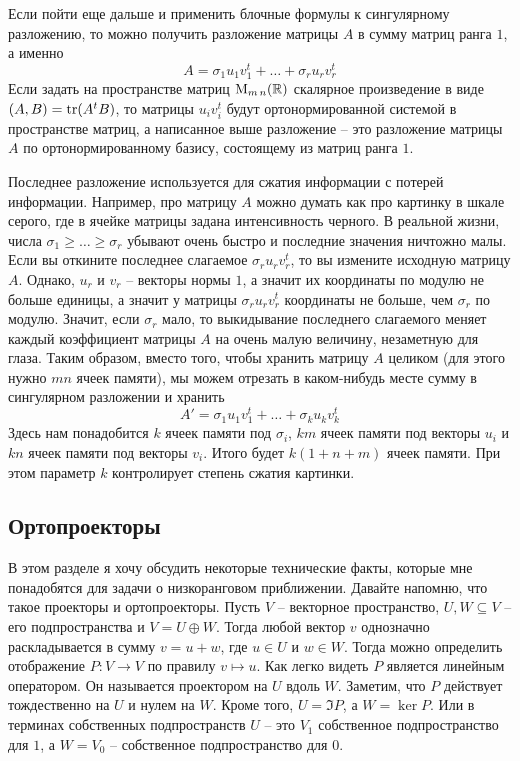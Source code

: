Если пойти еще дальше и применить блочные формулы к сингулярному разложению, то можно получить разложение матрицы $A$ в сумму матриц ранга $1$, а именно
\[
A = \sigma_1 u_1 v_1^t + \ldots + \sigma_r u_r v_r^t
\]
Если задать на пространстве матриц $\operatorname{M}_{m\,n}(\mathbb R)$ скалярное произведение в виде $(A, B) = \operatorname{tr}(A^t B)$, то матрицы $u_iv_i^t$ будут ортонормированной системой в пространстве матриц, а написанное выше разложение -- это разложение матрицы $A$ по ортонормированному базису, состоящему из матриц ранга $1$. 

Последнее разложение используется для сжатия информации с потерей информации. Например, про матрицу $A$ можно думать как про картинку в шкале серого, где в ячейке матрицы задана интенсивность черного. В реальной жизни, числа $\sigma_1\geqslant \ldots \geqslant \sigma_r$ убывают очень быстро и последние значения ничтожно малы. Если вы откините последнее слагаемое $\sigma_ru_rv_r^t$, то вы измените исходную матрицу $A$. Однако, $u_r$ и $v_r$ -- векторы нормы $1$, а значит их координаты по модулю не больше единицы, а значит у матрицы $\sigma_r u_rv_r^t$ координаты не больше, чем $\sigma_r$ по модулю. Значит, если $\sigma_r$  мало, то выкидывание последнего слагаемого меняет каждый коэффициент матрицы $A$ на очень малую величину, незаметную для глаза. Таким образом, вместо того, чтобы хранить матрицу $A$ целиком (для этого нужно $mn$ ячеек памяти), мы можем отрезать в каком-нибудь месте сумму в сингулярном разложении и хранить
\[
A' = \sigma_1 u_1 v_1^t + \ldots + \sigma_k u_k v_k^t
\]
Здесь нам понадобится $k$ ячеек памяти под $\sigma_i$, $km$ ячеек памяти под векторы $u_i$ и $kn$ ячеек памяти под векторы $v_i$. Итого будет $k(1 + n + m)$ ячеек памяти. При этом параметр $k$ контролирует степень сжатия картинки.

\subsection{Ортопроекторы}

В этом разделе я хочу обсудить некоторые технические факты, которые мне понадобятся для задачи о низкоранговом приближении. Давайте напомню, что такое проекторы и ортопроекторы. Пусть $V$ -- векторное пространство, $U, W\subseteq V$ -- его подпространства и $V = U \oplus W$. Тогда любой вектор $ v$ однозначно раскладывается в сумму $v = u + w$, где $u\in U$ и $w\in W$. Тогда можно определить отображение $P\colon V\to V$ по правилу $v\mapsto u$. Как легко видеть $P$ является линейным оператором. Он называется проектором на $U$ вдоль $W$. Заметим, что $P$ действует тождественно на $U$ и нулем на $W$. Кроме того, $U = \Im P$, а $W = \ker P$. Или в терминах собственных подпространств $U$ -- это $V_1$ собственное подпространство для $1$, а $W = V_0$ -- собственное подпространство для $0$.

